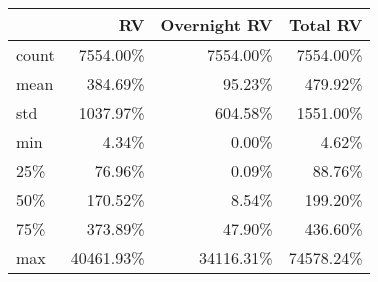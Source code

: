\begin{tabular}{lrrr}
\toprule
{} &        RV &  Overnight RV &  Total RV \\
\midrule
count &  7554.00\% &      7554.00\% &  7554.00\% \\
mean  &   384.69\% &        95.23\% &   479.92\% \\
std   &  1037.97\% &       604.58\% &  1551.00\% \\
min   &     4.34\% &         0.00\% &     4.62\% \\
25\%   &    76.96\% &         0.09\% &    88.76\% \\
50\%   &   170.52\% &         8.54\% &   199.20\% \\
75\%   &   373.89\% &        47.90\% &   436.60\% \\
max   & 40461.93\% &     34116.31\% & 74578.24\% \\
\bottomrule
\end{tabular}
